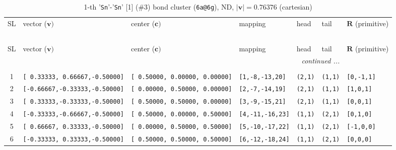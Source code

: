 \documentclass[fleqn,10pt,landscape]{jsarticle}
\begin{document}
\begin{longtable}[l]{cllllll}
\captionsetup{justification=raggedright, singlelinecheck=off}
\caption{1-th '\texttt{Sn}'-'\texttt{Sn}' [1] (\#3) bond cluster (\texttt{6a@6g}), ND, $|\bm{v}|=0.76376$ (cartesian)}
 \\
 \hline \hline
SL & vector ($\bm{v})$ & center ($\bm{c})$ & mapping & head & tail & $\bm{R}$ (primitive) \\ \hline \endfirsthead

\multicolumn{6}{l}{\tablename\ \thetable{}} \\
 \hline \hline
SL & vector ($\bm{v})$ & center ($\bm{c})$ & mapping & head & tail & $\bm{R}$ (primitive) \\ \hline \endhead

 \hline \hline
\multicolumn{6}{r}{\footnotesize\it continued ...} \\ \endfoot

 \hline \hline
\multicolumn{6}{r}{} \\ \endlastfoot

1 & \texttt{[ 0.33333, 0.66667,-0.50000]} & \texttt{[ 0.50000, 0.00000, 0.00000]} & \texttt{[1,-8,-13,20]} & \texttt{(2,1)} & \texttt{(1,1)} & \texttt{[0,-1,1]} \\ \hline
2 & \texttt{[-0.66667,-0.33333,-0.50000]} & \texttt{[ 0.00000, 0.50000, 0.00000]} & \texttt{[2,-7,-14,19]} & \texttt{(2,1)} & \texttt{(1,1)} & \texttt{[1,0,1]} \\ \hline
3 & \texttt{[ 0.33333,-0.33333,-0.50000]} & \texttt{[ 0.50000, 0.50000, 0.00000]} & \texttt{[3,-9,-15,21]} & \texttt{(2,1)} & \texttt{(1,1)} & \texttt{[0,0,1]} \\ \hline
4 & \texttt{[-0.33333,-0.66667,-0.50000]} & \texttt{[ 0.50000, 0.00000, 0.50000]} & \texttt{[4,-11,-16,23]} & \texttt{(1,1)} & \texttt{(2,1)} & \texttt{[0,1,0]} \\ \hline
5 & \texttt{[ 0.66667, 0.33333,-0.50000]} & \texttt{[ 0.00000, 0.50000, 0.50000]} & \texttt{[5,-10,-17,22]} & \texttt{(1,1)} & \texttt{(2,1)} & \texttt{[-1,0,0]} \\ \hline
6 & \texttt{[-0.33333, 0.33333,-0.50000]} & \texttt{[ 0.50000, 0.50000, 0.50000]} & \texttt{[6,-12,-18,24]} & \texttt{(1,1)} & \texttt{(2,1)} & \texttt{[0,0,0]} \\
\end{longtable}
\end{document}
